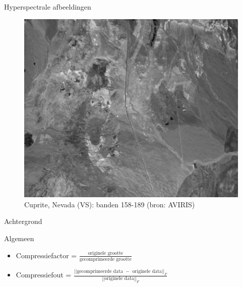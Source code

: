 \documentclass[t,12pt,dutch
\ifx\beamermode\undefined\else,\beamermode\fi
]{beamer}
\begin{document}
\begin{frame}{Hyperspectrale afbeeldingen}

\begin{figure}[H]
\centering
\includegraphics[scale=0.3]{images/cuprite_bands_158-190.png}
\caption{Cuprite, Nevada (VS): banden 158-189 (bron: AVIRIS)}
\end{figure}

\end{frame}


\begin{frame}{}
\begin{center}
\vspace*{\fill}
\vspace*{\fill}
\Huge
Achtergrond
\normalsize
\vspace*{\fill}
\end{center}
\end{frame}

\begin{frame}{Algemeen}

\begin{itemize}
\item Compressiefactor = $\frac{\text{originele grootte}}{\text{gecomprimeerde grootte}}$
\item Compressiefout = $\frac{||\text{gecomprimeerde data } - \text{ originele data}||_F}{||\text{originele data}||_F}$
\end{itemize}

\end{frame}
\end{document}
